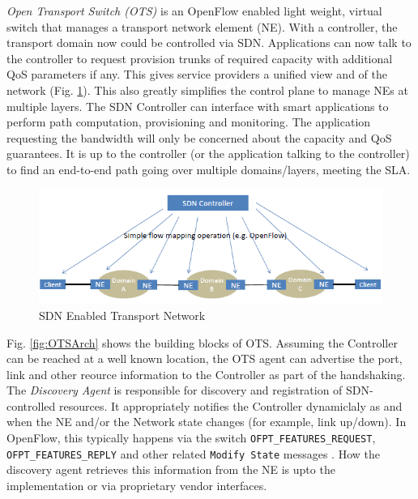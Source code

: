 \documentclass{sig-alternate-10pt}
\begin{document}
	\textit{Open Transport Switch (OTS)} is an OpenFlow \cite{OF1.0} enabled light weight, virtual switch
	that manages a transport network element (NE). With a controller, the transport domain now could be
	controlled via SDN. Applications can now talk to the controller to request provision trunks of required
	capacity with additional QoS parameters if any. This gives service providers a unified view and of the
	network (Fig. \ref{fig:MLwOF}). This also greatly simplifies the control plane to manage NEs at multiple
	layers. The SDN Controller can interface with smart applications to perform path computation,
	provisioning and monitoring. The application requesting the bandwidth will only be concerned about the
	capacity and QoS guarantees. It is up to the controller (or the application talking to the controller) to
	find an end-to-end path going over multiple domains/layers, meeting the SLA.
\fi
	\begin{figure}[htb]
	\centering
	\includegraphics[scale=0.50]{MLwOF.png}
	\caption{SDN Enabled Transport Network}
	\label{fig:MLwOF}
	\end{figure}

	Fig. \ref{fig:OTSArch} shows the building blocks of OTS. Assuming the Controller can be reached at a well
	known location, the OTS agent can advertise the port, link and other reource information to the
	Controller as part of the handshaking. The \textit{Discovery Agent} is responsible for discovery and
	registration of SDN-controlled resources. It appropriately notifies the Controller dynamiclaly as and
	when the NE and/or the Network state changes (for example, link up/down). In OpenFlow, this
	typically happens via the switch \texttt{OFPT\_FEATURES\_REQUEST}, \texttt{OFPT\_FEATURES\_REPLY} and
	other related \texttt{Modify State} messages \cite{OF1.0}. How the discovery agent retrieves this
	information from the NE is upto the implementation or via proprietary vendor interfaces. \\
	
\end{document}
